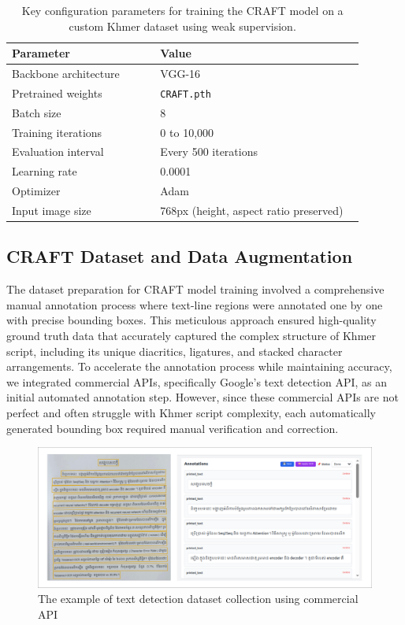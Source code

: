 \begin{table}[H]
\centering
\begin{tabular}{|p{0.4\linewidth}|p{0.55\linewidth}|}
\hline
\textbf{Parameter} & \textbf{Value} \\
\hline
Backbone architecture & VGG-16 \\
Pretrained weights & \texttt{CRAFT.pth} \\
Batch size & 8 \\
Training iterations & 0 to 10,000 \\
Evaluation interval & Every 500 iterations \\
Learning rate & 0.0001 \\
Optimizer & Adam \\
Input image size & 768px (height, aspect ratio preserved) \\
\hline
\end{tabular}
\caption{Key configuration parameters for training the CRAFT model on a custom Khmer dataset 
using weak supervision.}
\label{tab:craft-training-config}
\end{table}


\subsection{CRAFT Dataset and Data Augmentation}
\label{subsec:craft-dataset}

The dataset preparation for CRAFT model training involved a comprehensive manual 
annotation process where text-line regions were annotated one by one with precise 
bounding boxes. This meticulous approach ensured high-quality ground truth data 
that accurately captured the complex structure of Khmer script, including its 
unique diacritics, ligatures, and stacked character arrangements.
To accelerate the annotation process while maintaining accuracy, we integrated 
commercial APIs, specifically Google's text detection API, as an initial automated 
annotation step. However, since these commercial APIs are not perfect and often 
struggle with Khmer script complexity, each automatically generated bounding box 
required manual verification and correction. 


\begin{figure}[H]
    \centering
    \includegraphics[width=\textwidth]{figures/craft_text_annotation.png}
    \caption{The example of text detection dataset collection using commercial API}
    \label{fig:data_craft_collection}
\end{figure}



